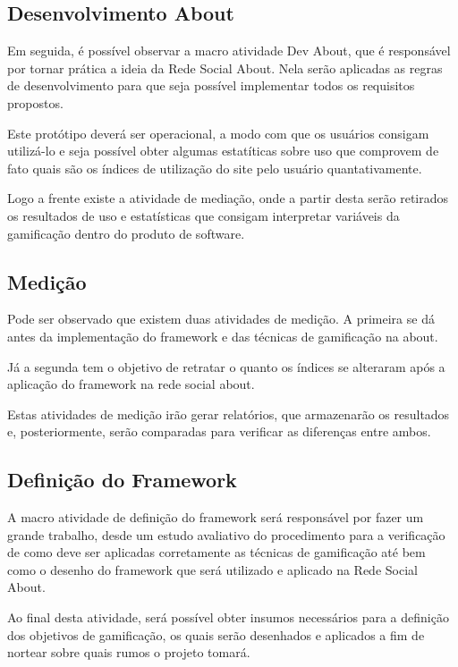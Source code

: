 \subsection{Desenvolvimento About}
\label{sub:Desenvolvimentoabout}
Em seguida, é possível observar a macro atividade Dev About, que é responsável
por tornar prática a ideia da Rede Social About. Nela serão aplicadas as
regras de desenvolvimento para que seja possível implementar todos os
requisitos propostos.

Este protótipo deverá ser operacional, a modo com que os usuários consigam
utilizá-lo e seja possível obter algumas estatíticas sobre uso que comprovem
de fato quais são os índices de utilização do site pelo usuário quantativamente.

Logo a frente existe a atividade de mediação, onde a partir desta serão retirados
os resultados de uso e estatísticas que consigam interpretar variáveis da gamificação
dentro do produto de software. 

\subsection{Medição}
\label{sub:medicao}
Pode ser observado que existem duas atividades de medição. A primeira se dá
antes da implementação do framework  e das técnicas de gamificação na about.

Já a segunda tem o objetivo de retratar o quanto os índices se alteraram após
a aplicação do framework na rede social about.

Estas atividades de medição irão gerar relatórios, que armazenarão os resultados
e, posteriormente, serão comparadas para verificar as diferenças entre ambos.

\subsection{Definição do Framework}
\label{sub:definicaoframework}
A macro atividade de definição do framework será responsável por fazer um grande
trabalho, desde um estudo avaliativo do procedimento para a verificação de como
deve ser aplicadas corretamente as técnicas de gamificação até bem como o desenho
do framework que será utilizado e aplicado na Rede Social About.

Ao final desta atividade, será possível obter insumos necessários para a definição
dos objetivos de gamificação, os quais serão desenhados e aplicados a fim
de nortear sobre quais rumos o projeto tomará.

